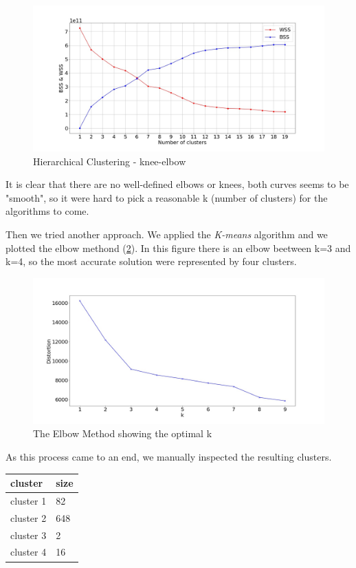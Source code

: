 \begin{figure} [htp!]
	\includegraphics[width=\linewidth]{chapter3/figure/kneeelbow.jpg}
	\caption{Hierarchical Clustering - knee-elbow}
	\label{fig:kneeelbow}
\end{figure}

It is clear that there are no well-defined elbows or knees, both curves seems to be "smooth", so it were hard to pick a reasonable k (number of clusters) for the algorithms to come.

Then we tried another approach. We applied the \emph{K-means} algorithm and we plotted the elbow methond (\ref{fig:elbow}). In this figure there is an elbow beetween k=3 and k=4, so the most accurate solution were represented by four clusters.

\begin{figure}
	\includegraphics[width=\linewidth]{chapter3/figure/elbow.jpg}
	\caption{The Elbow Method showing the optimal k}
	\label{fig:elbow}
\end{figure}

As this process came to an end, we manually inspected the resulting clusters.

\begin{center}
	\begin{tabular}{ll}
	\\cluster&size\\
	\hline\hline
	cluster 1&82\\
	cluster 2&648\\
	cluster 3&2\\
	cluster 4&16\\\hline
	\end{tabular}
\end{center}

